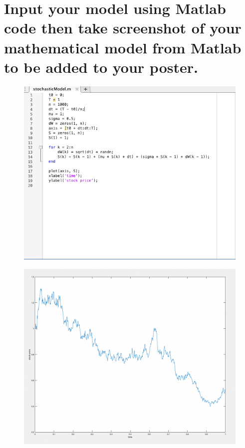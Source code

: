 \documentclass[12pt, A4]{article}
\begin{document}
		\section{Input your model using Matlab code then take screenshot of your mathematical model from Matlab to be added to your poster.}
			\begin{figure}[H]
				\includegraphics[width = \textwidth]{Images/MatLab_Model.png}
			\end{figure}
			\begin{figure}[H]
				\includegraphics[width = \textwidth]{Images/Matlab_Graph.png}	
			\end{figure}
\end{document}
